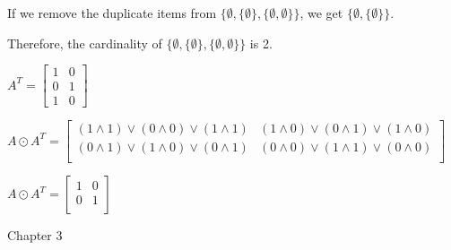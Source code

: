 \documentclass{exam}
\begin{document}
\begin{questions}
\begin{center}
If we remove the duplicate items from \( \{\emptyset, \{\emptyset\}, \{\emptyset, \emptyset\}\} \), we get \( \{\emptyset, \{\emptyset\} \}\).

Therefore, the cardinality of \( \{\emptyset, \{\emptyset\}, \{\emptyset, \emptyset\}\} \) is 2.

\end{center}



\begin{center}

\( A^T =
\begin{bmatrix}
1 & 0\\
0 & 1\\
1 & 0
\end{bmatrix}
\)

\( A \odot A^T =
\begin{bmatrix}
(1 \land 1) \lor (0 \land 0) \lor (1 \land 1) & (1 \land 0) \lor (0 \land 1) \lor (1 \land 0)\\
(0 \land 1) \lor (1 \land 0) \lor (0 \land 1) & (0 \land 0) \lor (1 \land 1) \lor (0 \land 0)\\
\end{bmatrix}
\)

\( A \odot A^T =
\begin{bmatrix}
1 & 0\\
0 & 1\\
\end{bmatrix}
\)

\end{center}





\vspace{10pt}
{\Large Chapter 3}
\vspace{2pt}

\end{questions}
\end{document}
